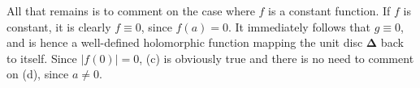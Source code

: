 \documentclass[a4paper, 12pt]{article} %
\begin{document}
All that remains is to comment on the case where $f$ is a constant function. If $f$ is constant, it is clearly $f \equiv 0$, since $f(a) = 0$. It immediately follows that $g \equiv 0$, and is hence a well-defined holomorphic function mapping the unit disc $\mathbf{\Delta}$ back to itself. Since $|f(0)| = 0$, (c) is obviously true and there is no need to comment on (d), since $a \neq 0$.
\end{document}
